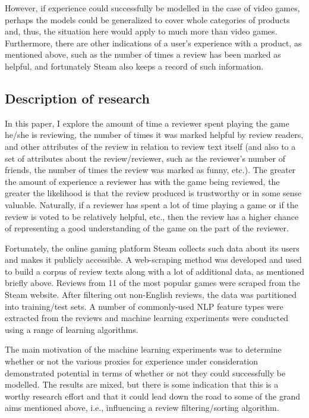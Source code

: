 \documentclass[9pt]{article}
\begin{document}
However, if experience could successfully be modelled in the case of video games, perhaps the models could be generalized to cover whole categories of products and, thus, the situation here would apply to much more than video games. Furthermore, there are other indications of a user's experience with a product, as mentioned above, such as the number of times a review has been marked as helpful, and fortunately Steam also keeps a record of such information.

\subsection{Description of research}

In this paper, I explore the amount of time a reviewer spent playing the game he/she is reviewing, the number of times it was marked helpful by review readers, and other attributes of the review in relation to review text itself (and also to a set of attributes about the review/reviewer, such as the reviewer's number of friends, the number of times the review was marked as funny, etc.). The greater the amount of experience a reviewer has with the game being reviewed, the greater the likelihood is that the review produced is trustworthy or in some sense valuable. Naturally, if a reviewer has spent a lot of time playing a game or if the review is voted to be relatively helpful, etc., then the review has a higher chance of representing a good understanding of the game on the part of the reviewer.

Fortunately, the online gaming platform Steam collects such data about its users and makes it publicly accessible. A web-scraping method was developed and used to build a corpus of review texts along with a lot of additional data, as mentioned briefly above. Reviews from 11 of the most popular games were scraped from the Steam website. After filtering out non-English reviews, the data was partitioned into training/test sets. A number of commonly-used NLP feature types were extracted from the reviews and machine learning experiments were conducted using a range of learning algorithms.

The main motivation of the machine learning experiments was to determine whether or not the various proxies for experience under consideration demonstrated potential in terms of whether or not they could successfully be modelled. The results are mixed, but there is some indication that this is a worthy research effort and that it could lead down the road to some of the grand aims mentioned above, i.e., influencing a review filtering/sorting algorithm.
\end{document}
